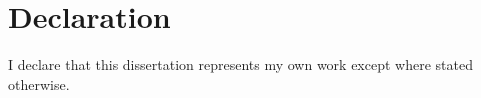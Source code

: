 \chapter*{Declaration}
I declare that this dissertation represents my own work except where stated otherwise.